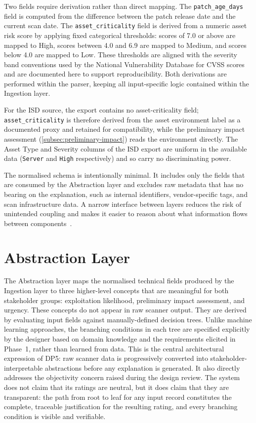 Two fields require derivation rather than direct mapping. The \texttt{patch\_age\_days} field is computed from the difference between the patch release date and the current scan date. The \texttt{asset\_criticality} field is derived from a numeric asset risk score by applying fixed categorical thresholds: scores of 7.0 or above are mapped to High, scores between 4.0 and 6.9 are mapped to Medium, and scores below 4.0 are mapped to Low. These thresholds are aligned with the severity band conventions used by the National Vulnerability Database for \ac{CVSS} scores and are documented here to support reproducibility. Both derivations are performed within the parser, keeping all input-specific logic contained within the Ingestion layer.

For the ISD source, the export contains no asset-criticality field; \texttt{asset\_criticality} is therefore derived from the asset environment label as a documented proxy and retained for compatibility, while the preliminary impact assessment (\cref{subsec:preliminary-impact}) reads the environment directly. The Asset Type and Severity columns of the ISD export are uniform in the available data (\texttt{Server} and \texttt{High} respectively) and so carry no discriminating power.

The normalised schema is intentionally minimal. It includes only the fields that are consumed by the Abstraction layer and excludes raw metadata that has no bearing on the explanation, such as internal identifiers, vendor-specific tags, and scan infrastructure data. A narrow interface between layers reduces the risk of unintended coupling and makes it easier to reason about what information flows between components~\cite{bass2012software}.

\section{Abstraction Layer}
\label{sec:abstraction-layer}

The Abstraction layer maps the normalised technical fields produced 
by the Ingestion layer to three higher-level concepts that are 
meaningful for both stakeholder groups: exploitation likelihood, 
preliminary impact assessment, and urgency. These concepts do not appear in raw scanner output. They are derived by evaluating input fields against 
manually-defined decision trees. Unlike machine learning approaches, 
the branching conditions in each tree are specified explicitly by 
the designer based on domain knowledge and the requirements elicited 
in Phase~1, rather than learned from data. This is the central 
architectural expression of DP5: raw scanner data is progressively 
converted into stakeholder-interpretable abstractions before any 
explanation is generated. It also directly addresses the objectivity 
concern raised during the design review. The system does not claim 
that its ratings are neutral, but it does claim that they are 
transparent: the path from root to leaf for any input record 
constitutes the complete, traceable justification for the resulting 
rating, and every branching condition is visible and verifiable.

